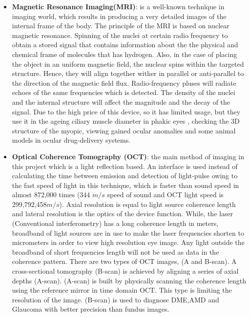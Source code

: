 \begin{itemize}
 
\item \textbf{Magnetic Resonance Imaging(MRI)}: is a well-known technique in imaging world, which results in producing a very detailed images of the internal frame of the body.
The principle of the MRI is based on nuclear magnetic resonance.
Spinning of the nuclei at certain radio frequency to obtain a stored signal that contains information about the the physical and chemical frame of molecules that has hydrogen.
Also, in the case of placing the object in an uniform magnetic field, the nuclear spins within the targeted structure.
Hence, they will align together wither in parallel or anti-parallel to the direction of the magnetic field flux.
Radio-frequency pluses will radiate echoes of the same frequencies which is detected.
The density of the nuclei and the internal structure will affect the magnitude and the decay of the signal.
Due to the high price of this device, so it has limited usage, but they use it in the ageing ciliary muscle diameter in phakic eyes \cite{strenk2004magnetic}, checking the 3D structure of the myopic, viewing gained ocular anomalies and some animal models in ocular drug-delivery systems\cite{kim2007assessment}.

\item \textbf{Optical Coherence Tomography (OCT)}: the main method of imaging in this project which is a light reflection based.
An interface is used instead of calculating the time between emission and detection of light-pulse owing to the fast speed of light in this technique, which is faster than sound speed in almost 872,000 times (344 $m/s$ speed of sound and OCT light speed is 299,792,458$m/s$).
Axial resolution is equal to light source coherence length and lateral resolution is the optics of the device function.
While, the laser (Conventional interferometry) has a long coherence length in meters, broadband of light sources are in use to make the laser frequencies shorten to micrometers in order to view high resolution eye image.
Any light outside the broadband of short frequencies length will not be used as data in the coherence pattern.
There are two types of OCT images, (A and B-scan).
A cross-sectional tomography (B-scan) is achieved by aligning a series of axial depths (A-scan).
(A-scan) is built by physically scanning the coherence length using the reference mirror in time domain OCT.
This type is limiting the resolution of the image. 
(B-scan) is used to diagnose DME,AMD and Glaucoma with better precision than fundus images.    
\end{itemize} 

